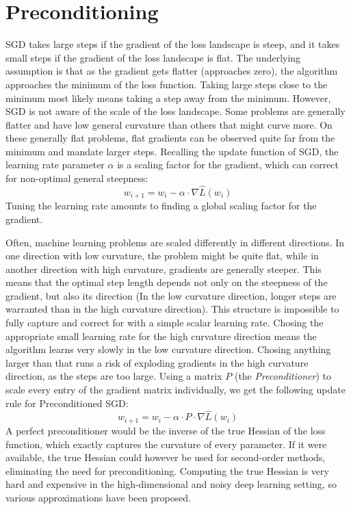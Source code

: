 \documentclass[twoside,12pt,a4paper]{report}
\begin{document}
\section{Preconditioning} \label{sec:preconditioning}
SGD takes large steps if the gradient of the loss landscape is steep, and it takes small steps if the gradient of the loss landscape is flat. The underlying assumption is that as the gradient gets flatter (approaches zero), the algorithm approaches the minimum of the loss function. Taking large steps close to the minimum most likely means taking a step away from the minimum.
However, SGD is not aware of the scale of the loss landscape. Some problems are generally flatter and have low general curvature than others that might curve more. On these generally flat problems, flat gradients can be observed quite far from the minimum and mandate larger steps.
Recalling the update function of SGD, the learning rate parameter $\alpha$ is a scaling factor for the gradient, which can correct for non-optimal general steepness:
$$w_{i+1} = w_i - \alpha \cdot \nabla \hat{L}(w_i) $$
Tuning the learning rate amounts to finding a global scaling factor for the gradient.

Often, machine learning problems are scaled differently in different directions. In one direction with low curvature, the problem might be quite flat, while in another direction with high curvature, gradients are generally steeper. This means that the optimal step length depends not only on the steepness of the gradient, but also its direction (In the low curvature direction, longer steps are warranted than in the high curvature direction).
This structure is impossible to fully capture and correct for with a simple scalar learning rate. Chosing the appropriate small learning rate for the high curvature direction means the algorithm learns very slowly in the low curvature direction. Chosing anything larger than that runs a risk of exploding gradients in the high curvature direction, as the steps are too large.
Using a matrix $P$ (the \textit{Preconditioner}) to scale every entry of the gradient matrix individually, we get the following update rule for Preconditioned SGD:
$$w_{i+1} = w_i - \alpha \cdot P \cdot \nabla \hat{L}(w_i) $$
A perfect preconditioner would be the inverse of the true Hessian of the loss function, which exactly captures the curvature of every parameter. If it were available, the true Hessian could however be used for second-order methods, eliminating the need for preconditioning.
Computing the true Hessian is very hard and expensive in the high-dimensional and noisy deep learning setting, so various approximations have been proposed.
\end{document}
